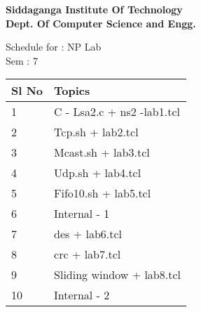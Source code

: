 \documentclass[12pt]{article}
\begin{document}
 \thispagestyle{empty}
\begin{center} {\Large \bf Siddaganga  Institute Of Technology   } \\ %
 {\large \bf  Dept. Of Computer Science and Engg.    } %
 \end{center} Schedule for :  NP Lab\\Sem :  7\\ 
  \begin{longtable} [!h] { | l |  l |   }   \hline Sl No   &    Topics \\ \hline 1  &   C - Lsa2.c + ns2 -lab1.tcl \\ \hline 
 2  &   Tcp.sh + lab2.tcl \\ \hline 
 3  &   Mcast.sh + lab3.tcl \\ \hline 
 4  &   Udp.sh + lab4.tcl \\ \hline 
 5  &   Fifo10.sh + lab5.tcl \\ \hline 
 6  &   Internal - 1 \\ \hline 
 7  &   des + lab6.tcl \\ \hline 
 8  &   crc + lab7.tcl \\ \hline 
 9  &   Sliding window + lab8.tcl \\ \hline 
 10  &   Internal - 2 \\ \hline 
   
  
 \end{longtable}  
 
\end{document}
